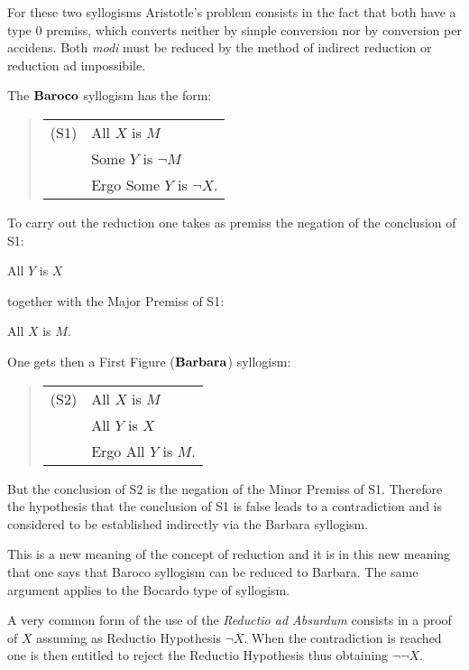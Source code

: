 \documentclass[12pt]{article}
\begin{document}
For these two syllogisms Aristotle's problem consists in the fact that both have a type 0 premiss, which converts neither by simple conversion nor by conversion per accidens. Both \emph{modi} must be reduced by the method of indirect reduction or reduction ad impossibile.

\vspace{2mm}

The $\bf Baroco$ syllogism has the form:

\begin{quote}
\begin{tabular}{ll}
(S1)&All $X$ is $M$\\
{}&Some $Y$ is $\neg M$\\
{}&Ergo Some $Y$ is $\neg X$.
\end{tabular}
\end{quote}

\vspace{2mm}

To carry out the reduction one takes as premiss the negation of the conclusion of S1:

All $Y$ is $X$

together with the Major Premiss of S1:

All $X$ is $M$.

\vspace{2mm}

One gets then a First Figure ($\bf Barbara$) syllogism:

\begin{quote}
\begin{tabular}{ll}
(S2)&All $X$ is $M$\\
{}&All $Y$ is $X$\\
{}&Ergo All $Y$ is $M$.
\end{tabular}
\end{quote}

\vspace{2mm}

But the conclusion of S2 is the negation of the Minor Premiss of S1. Therefore the hypothesis that the conclusion of S1 is false leads to a contradiction and is considered to be established indirectly via the Barbara syllogism.

This is a new meaning of the concept of reduction and it is in this new meaning that one says that Baroco syllogism can be reduced to Barbara. The same argument applies to the Bocardo type of syllogism.

A very common form of the use of the \emph{Reductio ad Absurdum} consists in a proof of $X$ assuming as Reductio Hypothesis $\neg X$. When the contradiction is reached one is then entitled to reject the Reductio Hypothesis thus obtaining $\neg \neg X$.
\end{document}
